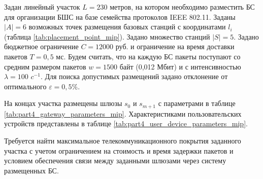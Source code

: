 
Задан линейный участок $L =230$ метров, на котором необходимо разместить БС для организации БШС на базе семейства протоколов IEEE 802.11. Заданы $|A| =6$ возможных точек размещения базовых станций с координатами $l_i$ (таблица \cref{tab:placement_point_mip}). Задано множество станций $|S| =5$. Задано бюджетное ограничение $C = 12000$ руб. и ограничение на время доставки пакетов $T = 0,5$  мс. Будем считать, что на каждую БС пакеты поступают со средним размером пакетов $w = 1500$ байт (0,012 Мбит) и с интенсивностью $\lambda = 100$ $c^{-1}$. Для поиска допустимых размещений задано отклонение от оптимального $\varepsilon = 0,5 \%$.


На концах участка размещены шлюзы $s_0 $ и $s_{m+1}$ с параметрами в таблице \cref{tab:part4_gateway_parameters_mip}. Характеристиками пользовательских устройств представлены в таблице \cref{tab:part4_user_device_parameters_mip}.

      


Требуется найти максимальное телекоммуникационного покрытия заданного участка с учетом ограничением на стоимость и время задержки пакетов и условием обеспечения связи между заданными шлюзами через систему размещенных БС.


